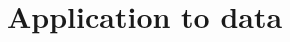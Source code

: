 \hypertarget{application-to-data}{%
\section{\texorpdfstring{Application to
\cite{doreRelativeEffectsAnthropogenic2021}
data}{Application to  data}}\label{application-to-data}}

\label{sec:application-to-dorerelativeeffectsanthropogenic2021-data}
